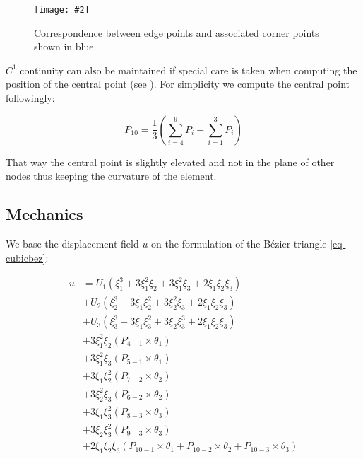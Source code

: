 \documentclass{egpubl}
\newcommand{\Figure}[3]{%
\begin{figure}[htb]
  \centering
  \texttt{[image: \#2]}
  \caption{\label{fig-#2}#3}
\end{figure}}
\begin{document}
\Figure{0.8\linewidth}{segments}
{Correspondence between edge points and associated corner points shown in
blue.}

$C^1$ continuity can also be maintained if special care is taken when
computing the position of the central point (see \cite{Ubach2010}). For
simplicity we compute the central point followingly:

\begin{equation}\label{eq-central}
    P_{10} = \frac{1}{3}(\sum_{i=4}^9 P_i - \sum_{i=1}^3 P_i)
\end{equation}


That way the central point is slightly elevated and not in the plane of
other nodes thus keeping the curvature of the element.



\subsection{Mechanics}

We base the displacement field $u$ on the formulation of the Bézier
triangle \eqref{eq-cubicbez}:

\begin{equation}\label{eq-bezU}
\begin{split}
  u & = U_1 ( \xi_1^3 + 3 \xi_1^2 \xi_2 + 3 \xi_1^2 \xi_3
        + 2 \xi_1 \xi_2 \xi_3 ) \\
    & + U_2 ( \xi_2^3 + 3 \xi_1 \xi_2^2 + 3 \xi_2^2 \xi_3
        + 2 \xi_1 \xi_2 \xi_3 ) \\
    & + U_3 ( \xi_3^3 + 3 \xi_1 \xi_3^2 + 3 \xi_2 \xi_3^3
        + 2 \xi_1 \xi_2 \xi_3 ) \\
    & + 3 \xi_1^2 \xi_2 (P_{4-1} \times \theta_1) \\
    & + 3 \xi_1^2 \xi_3 (P_{5-1} \times \theta_1) \\
    & + 3 \xi_1 \xi_2^2 (P_{7-2} \times \theta_2) \\
    & + 3 \xi_2^2 \xi_3 (P_{6-2} \times \theta_2) \\
    & + 3 \xi_1 \xi_3^2 (P_{8-3} \times \theta_3) \\
    & + 3 \xi_2 \xi_3^2 (P_{9-3} \times \theta_3) \\
    & + 2 \xi_1 \xi_2 \xi_3 (P_{10-1} \times \theta_1 +
        P_{10-2} \times \theta_2 +
        P_{10-3} \times \theta_3)
\end{split}
\end{equation}
\end{document}
